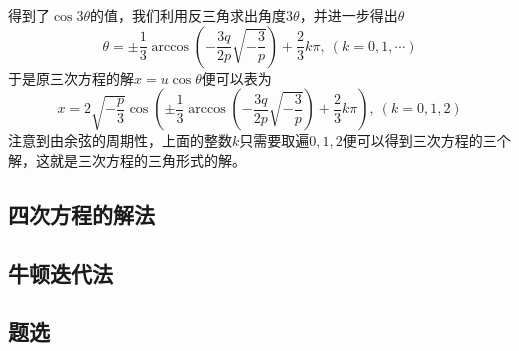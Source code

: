 得到了$\cos{3\theta}$的值，我们利用反三角求出角度$3\theta$，并进一步得出$\theta$
\[ \theta= \pm \frac{1}{3}\arccos \left( -\frac{3q}{2p}\sqrt{-\frac{3}{p}} \right) + \frac{2}{3}k\pi, \  (k=0,1,\cdots) \]
于是原三次方程的解$x=u\cos{\theta}$便可以表为
\[ x=2\sqrt{-\frac{p}{3}} \cos{\left( \pm \frac{1}{3}\arccos \left( -\frac{3q}{2p}\sqrt{-\frac{3}{p}} \right) + \frac{2}{3}k\pi \right)}, \  (k=0,1,2) \]
注意到由余弦的周期性，上面的整数$k$只需要取遍$0,1,2$便可以得到三次方程的三个解，这就是三次方程的三角形式的解。

\subsection{四次方程的解法}
\label{sec:solve-equation-with-4-degree}

\subsection{牛顿迭代法}
\label{sec:newton-iterator-method}

\subsection{题选}
\label{sec:exercise-of-solve-equation}

